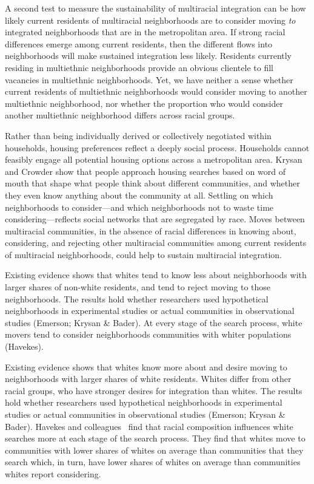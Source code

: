 \documentclass{baderart}
\renewcommand{\needcite}[1][]{%
	\strong{[CITE: %
		\ifthenelse{\equal{#1}{}}{}{: #1}	%
	]}}
\begin{document}
A second test to measure the sustainability of multiracial integration can be how likely current residents of multiracial neighborhoods are to consider moving \emph{to} integrated neighborhoods that are in the metropolitan area. If strong racial differences emerge among current residents, then the different flows into neighborhoods will make sustained integration less likely. Residents currently residing in multiethnic neighborhoods provide an obvious clientele to fill vacancies in multiethnic neighborhoods. Yet, we have neither a sense whether current residents of multiethnic neighborhoods would consider moving to another multiethnic neighborhood, nor whether the proportion who would consider another multiethnic neighborhood differs across racial groups.

Rather than being individually derived or collectively negotiated within households, housing preferences reflect a deeply social process. Households cannot feasibly engage all potential housing options across a metropolitan area. Krysan and Crowder \citeyearpar{krysan_cycle_2017} show that people approach housing searches based on word of mouth that shape what people think about different communities, and whether they even know anything about the community at all. Settling on which neighborhoods to consider---and which neighborhoods not to waste time considering---reflects social networks that are segregated by race.  Moves between multiracial communities, in the absence of racial differences in knowing about, considering, and rejecting other multiracial communities among current residents of multiracial neighborhoods, could help to sustain multiracial integration. 

Existing evidence shows that whites tend to know less about neighborhoods with larger shares of non-white residents, and tend to reject moving to those neighborhoods. The results hold whether researchers used hypothetical neighborhoods in experimental studies or actual communities in observational studies (Emerson; Krysan \& Bader). At every stage of the search process, white movers tend to consider neighborhoods communities with whiter populations (Havekes).



Existing evidence shows that whites know more about and desire moving to neighborhoods with larger shares of white residents. Whites differ from other racial groups, who have stronger desires for integration than whites. The results hold whether researchers used hypothetical neighborhoods in experimental studies or actual communities in observational studies (Emerson; Krysan \& Bader). Havekes and colleagues\needcite\ find that racial composition influences white searches more at each stage of the search process. They find that whites move to communities with lower shares of whites on average than communities that they search which, in turn, have lower shares of whites on average than communities whites report considering. 
\end{document}
